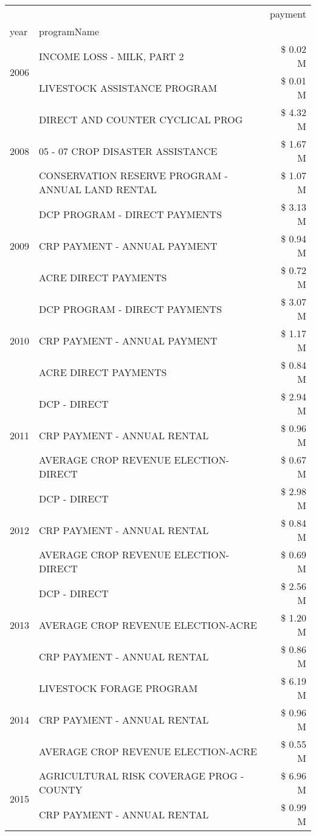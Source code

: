 \begin{tabular}{llr}
\toprule
 &  & payment \\
year & programName &  \\
\midrule
\multirow[t]{2}{*}{2006} & INCOME LOSS - MILK, PART 2 & \$ 0.02 M \\
 & LIVESTOCK ASSISTANCE PROGRAM & \$ 0.01 M \\
\cline{1-3}
\multirow[t]{3}{*}{2008} & DIRECT AND COUNTER CYCLICAL PROG & \$ 4.32 M \\
 & 05 - 07 CROP DISASTER ASSISTANCE & \$ 1.67 M \\
 & CONSERVATION RESERVE PROGRAM - ANNUAL LAND RENTAL & \$ 1.07 M \\
\cline{1-3}
\multirow[t]{3}{*}{2009} & DCP PROGRAM - DIRECT PAYMENTS & \$ 3.13 M \\
 & CRP PAYMENT - ANNUAL PAYMENT & \$ 0.94 M \\
 & ACRE DIRECT PAYMENTS & \$ 0.72 M \\
\cline{1-3}
\multirow[t]{3}{*}{2010} & DCP PROGRAM - DIRECT PAYMENTS & \$ 3.07 M \\
 & CRP PAYMENT - ANNUAL PAYMENT & \$ 1.17 M \\
 & ACRE DIRECT PAYMENTS & \$ 0.84 M \\
\cline{1-3}
\multirow[t]{3}{*}{2011} & DCP - DIRECT & \$ 2.94 M \\
 & CRP PAYMENT - ANNUAL RENTAL & \$ 0.96 M \\
 & AVERAGE CROP REVENUE ELECTION-DIRECT & \$ 0.67 M \\
\cline{1-3}
\multirow[t]{3}{*}{2012} & DCP - DIRECT & \$ 2.98 M \\
 & CRP PAYMENT - ANNUAL RENTAL & \$ 0.84 M \\
 & AVERAGE CROP REVENUE ELECTION-DIRECT & \$ 0.69 M \\
\cline{1-3}
\multirow[t]{3}{*}{2013} & DCP - DIRECT & \$ 2.56 M \\
 & AVERAGE CROP REVENUE ELECTION-ACRE & \$ 1.20 M \\
 & CRP PAYMENT - ANNUAL RENTAL & \$ 0.86 M \\
\cline{1-3}
\multirow[t]{3}{*}{2014} & LIVESTOCK FORAGE PROGRAM & \$ 6.19 M \\
 & CRP PAYMENT - ANNUAL RENTAL & \$ 0.96 M \\
 & AVERAGE CROP REVENUE ELECTION-ACRE & \$ 0.55 M \\
\cline{1-3}
\multirow[t]{3}{*}{2015} & AGRICULTURAL RISK COVERAGE PROG - COUNTY & \$ 6.96 M \\
 & CRP PAYMENT - ANNUAL RENTAL & \$ 0.99 M \\

\end{tabular}
